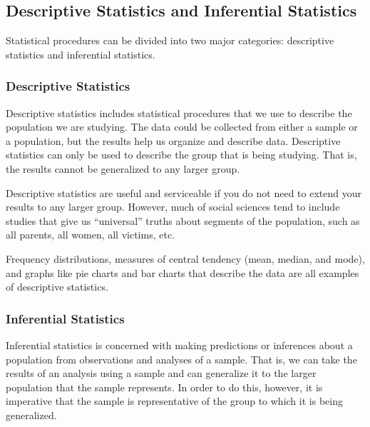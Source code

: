 \subsection{Descriptive Statistics and Inferential Statistics}


Statistical procedures can be divided into two major categories: descriptive statistics and inferential statistics.


\subsubsection*{Descriptive Statistics}

Descriptive statistics includes statistical procedures that we use to describe the population we are studying. The data could be collected from either a sample or a population, but the results help us organize and describe data. Descriptive statistics can only be used to describe the group that is being studying. That is, the results cannot be generalized to any larger group.

Descriptive statistics are useful and serviceable if you do not need to extend your results to any larger group. However, much of social sciences tend to include studies that give us “universal” truths about segments of the population, such as all parents, all women, all victims, etc.

Frequency distributions, measures of central tendency (mean, median, and mode), and graphs like pie charts and bar charts that describe the data are all examples of descriptive statistics.

\subsubsection*{Inferential Statistics}

Inferential statistics is concerned with making predictions or inferences about a population from observations and analyses of a sample. That is, we can take the results of an analysis using a sample and can generalize it to the larger population that the sample represents. In order to do this, however, it is imperative that the sample is representative of the group to which it is being generalized.

